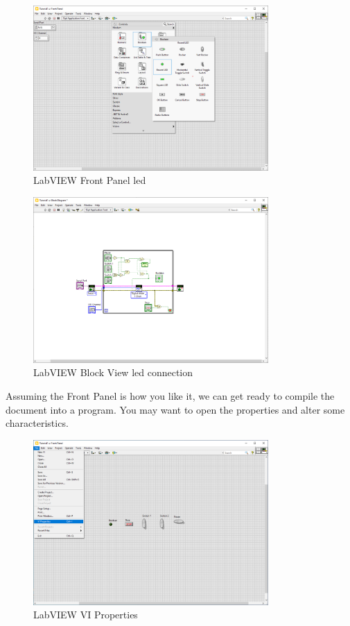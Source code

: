 \documentclass[a4paper,11pt]{report}
\begin{document}
\begin{figure}[H]
\centering
\includegraphics[width=0.8\textwidth]{screenshots/labview34}
\caption{LabVIEW Front Panel \gls{led}}
\end{figure}

\begin{figure}[H]
\centering
\includegraphics[width=0.8\textwidth]{screenshots/labview35}
\caption{LabVIEW Block View \gls{led} connection}
\end{figure}

Assuming the Front Panel is how you like it, we can get ready to compile the document into a program. You may want to open the properties and alter some characteristics.

\begin{figure}[H]
\centering
\includegraphics[width=0.8\textwidth]{screenshots/labview36}
\caption{LabVIEW VI Properties}
\end{figure}
\end{document}
